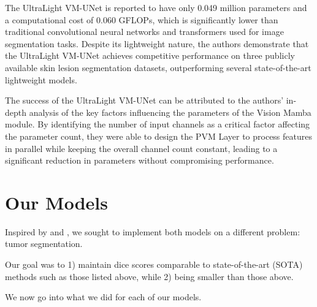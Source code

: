 \documentclass[conference]{IEEEtran}
\begin{document}
The UltraLight VM-UNet is reported to have only 0.049 million parameters and a computational cost of 0.060 GFLOPs, which is significantly lower than traditional convolutional neural networks and transformers used for image segmentation tasks. Despite its lightweight nature, the authors demonstrate that the UltraLight VM-UNet achieves competitive performance on three publicly available skin lesion segmentation datasets, outperforming several state-of-the-art lightweight models.

The success of the UltraLight VM-UNet can be attributed to the authors' in-depth analysis of the key factors influencing the parameters of the Vision Mamba module. By identifying the number of input channels as a critical factor affecting the parameter count, they were able to design the PVM Layer to process features in parallel while keeping the overall channel count constant, leading to a significant reduction in parameters without compromising performance.

\section{Our Models}

Inspired by \cite{U-Mamba} and \cite{ultralightvmunet}, we sought to implement both models on a different problem: tumor segmentation.

Our goal was to 1) maintain dice scores comparable to state-of-the-art (SOTA) methods such as those listed above, while 2) being smaller than those above.

We now go into what we did for each of our models.
\end{document}
